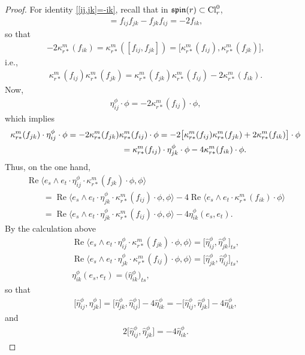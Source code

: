 \documentclass[10pt,a4paper]{amsart}
\numberwithin{equation}{section}
\begin{document}
\begin{proof}
For identity \eqref{[ij,jk]=-ik}, recall that in $\mathfrak{spin}(r)\subset {\rm Cl}_r^0$,
\begin{gather*}
[f_{ij},f_{jk}] = f_{ij}f_{jk}-f_{jk}f_{ij}= -2f_{ik},
\end{gather*}
so that
\begin{gather*}
 -2\kappa_{r*}^m(f_{ik}) =\kappa_{r*}^m([f_{ij},f_{jk}])= \big[\kappa_{r*}^m(f_{ij}),\kappa_{r*}^m(f_{jk})\big],
\end{gather*}
i.e.,
\begin{gather*}\kappa_{r*}^m(f_{ij})\kappa_{r*}^m(f_{jk})
=\kappa_{r*}^m(f_{jk})\kappa_{r*}^m(f_{ij})-2\kappa_{r*}^m(f_{ik}).\end{gather*}
Now,
\begin{gather*}\eta_{ij}^\phi\cdot\phi = -2 \kappa_{r*}^m(f_{ij})\cdot \phi,\end{gather*}
which implies
\begin{gather*}
\kappa_{r*}^m(f_{jk})\cdot\eta_{ij}^\phi\cdot \phi = -2 \kappa_{r*}^m(f_{jk})\kappa_{r*}^m(f_{ij})\cdot
\phi= -2 \big[\kappa_{r*}^m(f_{ij})\kappa_{r*}^m(f_{jk})+2\kappa_{r*}^m(f_{ik})\big]\cdot \phi\\
\hphantom{\kappa_{r*}^m(f_{jk})\cdot\eta_{ij}^\phi\cdot \phi}{}
= \kappa_{r*}^m(f_{ij})\cdot\eta_{jk}^\phi\cdot \phi - 4 \kappa_{r*}^m(f_{ik})\cdot \phi.
\end{gather*}
Thus, on the one hand,
\begin{gather*}
\operatorname{Re}\big\langle e_s\wedge e_t \cdot \eta_{ij}^\phi\cdot \kappa_{r*}^m(f_{jk})\cdot\phi,\phi\big\rangle\\
\qquad{} = \operatorname{Re}\big\langle e_s\wedge e_t \cdot \eta_{jk}^\phi\cdot
\kappa_{r*}^m(f_{ij})\cdot\phi,\phi\big\rangle - 4\operatorname{Re}\big\langle e_s\wedge e_t\cdot
\kappa_{r*}^m(f_{ik})\cdot\phi \big\rangle \\
 \qquad = \operatorname{Re}\big\langle e_s\wedge e_t \cdot \eta_{jk}^\phi\cdot
\kappa_{r*}^m(f_{ij})\cdot\phi,\phi\big\rangle - 4 \eta_{ik}^\phi(e_s,e_t).
\end{gather*}
By the calculation above
\begin{gather*}
\operatorname{Re}\big\langle e_s\wedge e_t \cdot \eta_{ij}^\phi\cdot \kappa_{r*}^m(f_{jk})\cdot\phi,\phi\big\rangle
 = \big[\hat\eta_{ij}^\phi,\hat\eta_{jk}^\phi\big]_{ts},\\
\operatorname{Re}\big\langle e_s\wedge e_t \cdot \eta_{jk}^\phi\cdot \kappa_{r*}^m(f_{ij})\cdot\phi,\phi\big\rangle= \big[\hat\eta_{jk}^\phi,\hat\eta_{ij}^\phi\big]_{ts},\\
\eta_{ik}^\phi(e_s,e_t) = \big(\hat\eta_{ik}^\phi\big)_{ts},
\end{gather*}
so that
\begin{gather*}
\big[\hat\eta_{ij}^\phi,\hat\eta_{jk}^\phi \big] =\big[\hat\eta_{jk}^\phi,\hat\eta_{ij}^\phi\big] - 4\hat\eta_{ik}^\phi
 = - \big[\hat\eta_{ij}^\phi,\hat\eta_{jk}^\phi \big] - 4\hat\eta_{ik}^\phi,
\end{gather*}
and
\begin{gather*}
2 \big[\hat\eta_{ij}^\phi,\hat\eta_{jk}^\phi\big] = -4\hat\eta_{ik}^\phi.\tag*{\qed}
\end{gather*}\renewcommand{\qed}{}
\end{proof}
\end{document}

